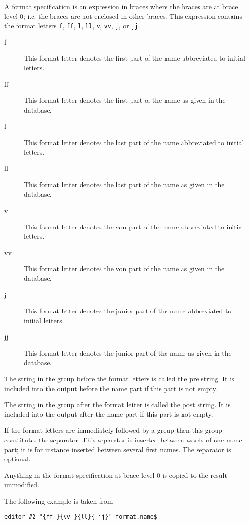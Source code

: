 A format specification is an expression in braces where the braces are
at brace level 0; i.e. the braces are not enclosed in other braces.
This expression contains the format letters \texttt{f}, \texttt{ff},
\texttt{l}, \texttt{ll}, \texttt{v}, \texttt{vv}, \texttt{j}, or
\texttt{jj}. 

\begin{description}
\item[f] This format letter denotes the first part of the name
  abbreviated to initial letters.
\item[ff] This format letter denotes the first part of the name as
  given in the database.
\item[l] This format letter denotes the last part of the name
  abbreviated to initial letters. 
\item[ll] This format letter denotes the last part of the name as
  given in the database.
\item[v] This format letter denotes the von part of the name
  abbreviated to initial letters.
\item[vv] This format letter denotes the von part of the name as
  given in the database.
\item[j] This format letter denotes the junior part of the name
  abbreviated to initial letters.
\item[jj] This format letter denotes the junior part of the name as
  given in the database.
\end{description}

The string in the group before the format letters is called the pre
string. It is included into the output before the name part if this
part is not empty.

The string in the group after the format letter is called the post
string. It is included into the output after the name part if this
part is not empty.

If the format letters are immediately followed by a group then this
group constitutes the separator. This separator is inserted between
words of one name part; it is for instance inserted between several
first names. The separator is optional.

\INCOMPLETE

Anything in the format specification at brace level 0 is copied to the
result unmodified.

The following example is taken from :

\begin{lstlisting}[language=bst]
  editor #2 "{ff }{vv }{ll}{ jj}" format.name$
\end{lstlisting}%


